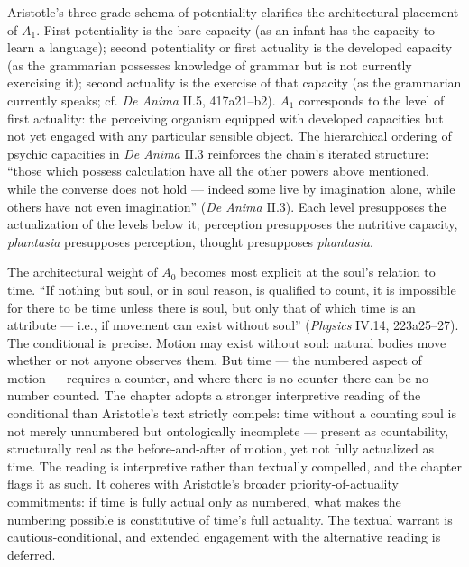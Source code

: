 Aristotle's three-grade schema of potentiality clarifies the architectural placement of $A_1$. First potentiality is the bare capacity (as an infant has the capacity to learn a language); second potentiality or first actuality is the developed capacity (as the grammarian possesses knowledge of grammar but is not currently exercising it); second actuality is the exercise of that capacity (as the grammarian currently speaks; cf. \textit{De Anima} II.5, 417a21--b2). $A_1$ corresponds to the level of first actuality: the perceiving organism equipped with developed capacities but not yet engaged with any particular sensible object. The hierarchical ordering of psychic capacities in \textit{De Anima} II.3 reinforces the chain's iterated structure: ``those which possess calculation have all the other powers above mentioned, while the converse does not hold --- indeed some live by imagination alone, while others have not even imagination'' (\textit{De Anima} II.3). Each level presupposes the actualization of the levels below it; perception presupposes the nutritive capacity, \textit{phantasia} presupposes perception, thought presupposes \textit{phantasia}.

The architectural weight of $A_0$ becomes most explicit at the soul's relation to time. ``If nothing but soul, or in soul reason, is qualified to count, it is impossible for there to be time unless there is soul, but only that of which time is an attribute --- i.e., if movement can exist without soul'' (\textit{Physics} IV.14, 223a25--27). The conditional is precise. Motion may exist without soul: natural bodies move whether or not anyone observes them. But time --- the numbered aspect of motion --- requires a counter, and where there is no counter there can be no number counted. The chapter adopts a stronger interpretive reading of the conditional than Aristotle's text strictly compels: time without a counting soul is not merely unnumbered but ontologically incomplete --- present as countability, structurally real as the before-and-after of motion, yet not fully actualized as time. The reading is interpretive rather than textually compelled, and the chapter flags it as such. It coheres with Aristotle's broader priority-of-actuality commitments: if time is fully actual only as numbered, what makes the numbering possible is constitutive of time's full actuality. The textual warrant is cautious-conditional, and extended engagement with the alternative reading is deferred.

